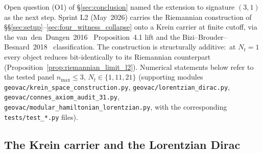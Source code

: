 \documentclass[11pt,a4paper]{article}
\theoremstyle{plain}
\theoremstyle{definition}
\newcommand{\nmax}{n_{\max}}
\newcommand{\Nt}{N_t}
\begin{document}
Open question (O1) of \S\ref{sec:conclusion} named the extension to
signature $(3, 1)$ as the next step.  Sprint L2 (May~2026) carries the
Riemannian construction of
\S\S\ref{sec:setup}--\ref{sec:four_witness_collapse} onto a Krein
carrier at finite cutoff, via the van~den~Dungen~2016~\cite{vandungen2016}
Proposition~4.1 lift and the
Bizi--Brouder--Besnard~2018~\cite{bizi_brouder_besnard2018}
classification.  The construction is structurally additive:\ at
$\Nt = 1$ every object reduces bit-identically to its Riemannian
counterpart (Proposition~\ref{prop:riemannian_limit_l2}).  Numerical
statements below refer to the tested panel
$\nmax \le 3$, $\Nt \in \{1, 11, 21\}$ (supporting modules
\texttt{geovac/krein\_space\_construction.py},
\texttt{geovac/lorentzian\_dirac.py},
\texttt{geovac/connes\_axiom\_audit\_31.py},
\texttt{geovac/modular\_hamiltonian\_lorentzian.py}, with the
corresponding \texttt{tests/test\_*.py} files).

\subsection{The Krein carrier and the Lorentzian Dirac}
\label{sec:krein_carrier}
\label{sec:lorentzian_closure_architecture}
\end{document}
